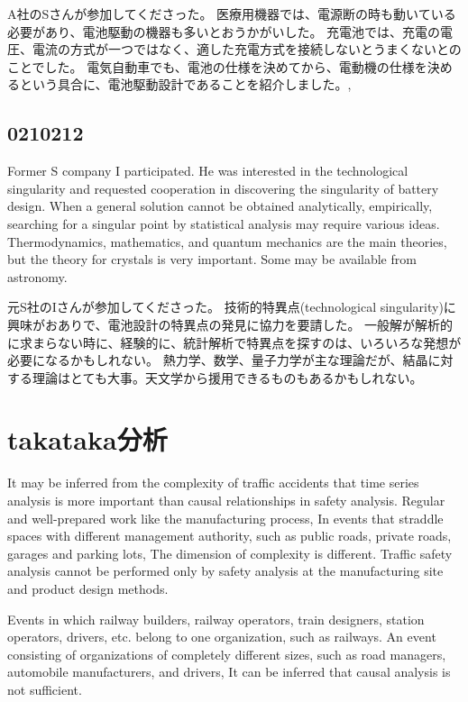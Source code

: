\documentclass[twocolumn]{article} %
\begin{document}
A社のSさんが参加してくださった。
医療用機器では、電源断の時も動いている必要があり、電池駆動の機器も多いとおうかがいした。
充電池では、充電の電圧、電流の方式が一つではなく、適した充電方式を接続しないとうまくないとのことでした。
電気自動車でも、電池の仕様を決めてから、電動機の仕様を決めるという具合に、電池駆動設計であることを紹介しました。\cite{qiita73}, \cite{qiitaf7}

\subsection{0210212}
Former S company I participated.
He was interested in the technological singularity and requested cooperation in discovering the singularity of battery design.
When a general solution cannot be obtained analytically, empirically, searching for a singular point by statistical analysis may require various ideas.
Thermodynamics, mathematics, and quantum mechanics are the main theories, but the theory for crystals is very important. Some may be available from astronomy.

元S社のIさんが参加してくださった。
技術的特異点(technological singularity)に興味がおありで、電池設計の特異点の発見に協力を要請した。
一般解が解析的に求まらない時に、経験的に、統計解析で特異点を探すのは、いろいろな発想が必要になるかもしれない。
熱力学、数学、量子力学が主な理論だが、結晶に対する理論はとても大事。天文学から援用できるものもあるかもしれない。


\section{takataka分析}
It may be inferred from the complexity of traffic accidents that time series analysis is more important than causal relationships in safety analysis.
Regular and well-prepared work like the manufacturing process,
In events that straddle spaces with different management authority, such as public roads, private roads, garages and parking lots,
The dimension of complexity is different.
Traffic safety analysis cannot be performed only by safety analysis at the manufacturing site and product design methods.

Events in which railway builders, railway operators, train designers, station operators, drivers, etc. belong to one organization, such as railways.
An event consisting of organizations of completely different sizes, such as road managers, automobile manufacturers, and drivers,
It can be inferred that causal analysis is not sufficient.
\end{document}
